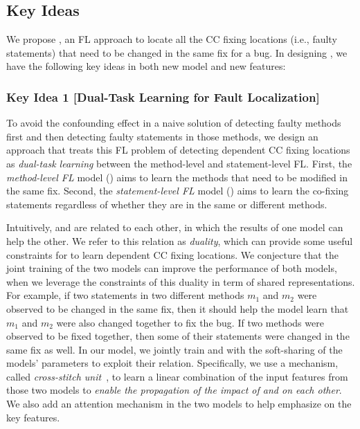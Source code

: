 \subsection{Key Ideas}
\label{sec:key-ideas}


We propose {\tool}, an FL approach to locate all the CC fixing
locations (i.e., faulty statements) that need to be changed in the
same fix for a bug. In designing {\tool}, we have the following key
ideas in both new model and new features:


\subsubsection{Key Idea 1 [Dual-Task Learning for Fault Localization]}
To avoid the confounding effect in a naive solution of detecting
faulty methods first and then detecting faulty statements in those
methods, we design an approach that treats this FL problem of
detecting dependent CC fixing locations as {\em dual-task learning}
between the method-level and statement-level FL. First, the {\em
  method-level FL} model () aims to learn the methods
that need to be modified in the same fix. Second, the {\em
  statement-level FL} model () aims to learn the
co-fixing statements regardless of whether they are in the same or
different methods.

Intuitively,  and  are related to each
other, in which the results of one model can help the other. We refer
to this relation as {\em duality}, which can provide some useful
constraints for {\tool} to learn dependent CC fixing locations.  We
conjecture that the joint training of the two models can improve the
performance of both models, when we leverage the constraints of this
duality in term of shared representations. For example, if two
statements in two different methods $m_1$ and $m_2$ were observed to
be changed in the same fix, then it should help the model learn that
$m_1$ and $m_2$ were also changed together to fix the bug.  If two
methods were observed to be fixed together, then some of their
statements were changed in the same fix as well. In our model, we
jointly train  and  with the soft-sharing of
the models' parameters to exploit their relation. Specifically, we use
a mechanism, called {\em cross-stitch unit}~\cite{misra2016cross}, to
learn a linear combination of the input features from those two models to
{\em enable the propagation of the impact of  and
   on each other}.
We also add an attention mechanism in the two models to help emphasize
on the key features.


